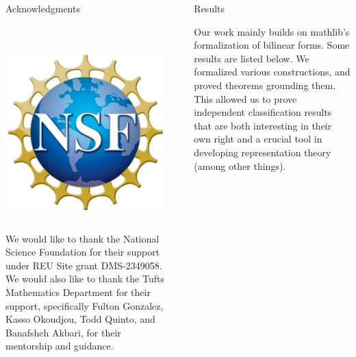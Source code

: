 \documentclass[final]{beamer}
\newlength{\sepwidth}
\newlength{\colwidth}
\newcommand{\separatorcolumn}{\begin{column}{\sepwidth}\end{column}}
\begin{document}
\begin{frame}[t]
\begin{columns}[t]
\begin{column}{\colwidth}
{\onehalfspacing
\begin{alertblock}{{\Large Acknowledgments}}
    \begin{columns}[T]
            \includegraphics[height=7.5cm]{NSF logo.png}
        {\small We would like to thank the National Science Foundation for their support under REU Site grant DMS-2349058. We would also like to thank the Tufts Mathematics Department for their support, specifically Fulton Gonzalez, Kasso Okoudjou, Todd Quinto, and Banafsheh Akbari, for their mentorship and guidance.} %
    \end{columns}
\end{alertblock}
}

\end{column}

\separatorcolumn

\begin{column}{\colwidth}

\begin{exampleblock}{{\LARGE Results}}


{\large Our work mainly builds on mathlib’s formalization of bilinear forms. Some results are listed below. We formalized various constructions, and proved theorems grounding them. This allowed us to prove independent classification results that are both interesting in their own right and a crucial tool in developing representation theory (among other things). }




\end{exampleblock}
\end{column}
\end{columns}
\end{frame}
\end{document}
